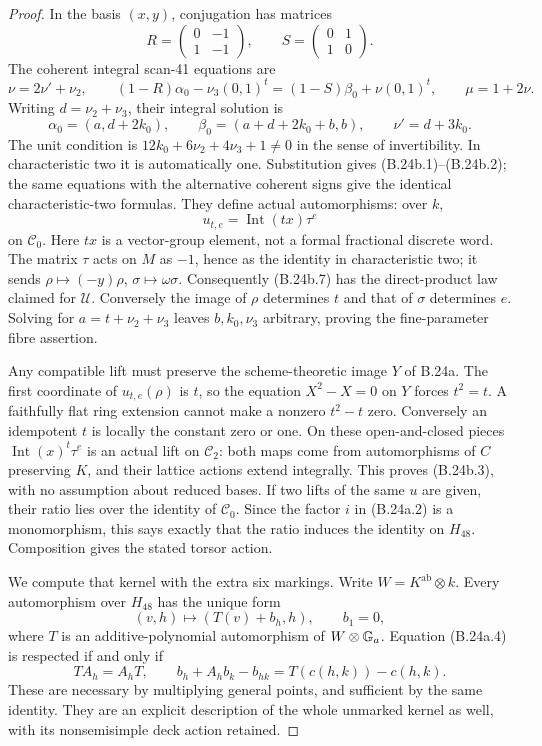 \begin{proof}
In the basis $(x,y)$, conjugation has matrices
\[
 R=\begin{pmatrix}0&-1\\1&-1\end{pmatrix},\qquad
 S=\begin{pmatrix}0&1\\1&0\end{pmatrix}.
\]
The coherent integral scan-41 equations are
\[
 \nu=2\nu'+\nu_2,\qquad
 (1-R)\alpha_0-\nu_3(0,1)^t
   =(1-S)\beta_0+\nu(0,1)^t,\qquad \mu=1+2\nu.
\]
Writing $d=\nu_2+\nu_3$, their integral solution is
\[
 \alpha_0=(a,d+2k_0),\qquad
 \beta_0=(a+d+2k_0+b,b),\qquad \nu'=d+3k_0.
\]
The unit condition is $12k_0+6\nu_2+4\nu_3+1\ne0$ in the
sense of invertibility.  In characteristic two it is automatically
one.  Substitution gives (B.24b.1)--(B.24b.2); the same equations with
the alternative coherent signs give the identical characteristic-two
formulas.  They define actual automorphisms: over $k$,
\[
                    u_{t,e}=\operatorname{Int}(t x)\tau^e
 \tag{B.24b.7}
\]
on $\mathscr C_0$.  Here $t x$ is a vector-group element, not a
formal fractional discrete word.  The matrix $\tau$ acts on $M$ as
$-1$, hence as the identity in characteristic two; it sends
$\rho\mapsto(-y)\rho$, $\sigma\mapsto\omega\sigma$.
Consequently (B.24b.7) has the direct-product law claimed for
$\mathscr U$.  Conversely the image of $\rho$ determines $t$
and that of $\sigma$ determines $e$.  Solving for
$a=t+\nu_2+\nu_3$ leaves $b,k_0,\nu_3$ arbitrary, proving the
fine-parameter fibre assertion.

Any compatible lift must preserve the scheme-theoretic image $Y$ of
B.24a.  The first coordinate of $u_{t,e}(\rho)$ is $t$, so the equation
$X^2-X=0$ on $Y$ forces $t^2=t$.  A faithfully flat ring extension
cannot make a nonzero $t^2-t$ zero.  Conversely an idempotent $t$
is locally the constant zero or one.  On these open-and-closed pieces
$\operatorname{Int}(x)^t\tau^e$ is an actual lift on $\mathscr C_2$:
both maps come from automorphisms of $C$ preserving $K$, and their
lattice actions extend integrally.  This proves (B.24b.3), with no
assumption about reduced bases.  If two lifts of the same $u$ are given,
their ratio lies over the identity of $\mathscr C_0$.  Since the
factor $i$ in (B.24a.2) is a monomorphism, this says exactly that the
ratio induces the identity on $H_{48}$.  Composition gives the stated
torsor action.

We compute that kernel with the extra six markings.  Write
$W=K^{\mathrm{ab}}\otimes k$.  Every automorphism over $H_{48}$
has the unique form
\[
             (v,h)\longmapsto(T(v)+b_h,h),\qquad b_1=0,
 \tag{B.24b.8}
\]
where $T$ is an additive-polynomial automorphism of $W\otimes\mathbb G_a$.
Equation (B.24a.4) is respected if and only if
\[
 T A_h=A_hT,\qquad
 b_h+A_hb_k-b_{hk}=T(c(h,k))-c(h,k).
 \tag{B.24b.9}
\]
These are necessary by multiplying general points, and sufficient by
the same identity.  They are an explicit description of the whole
unmarked kernel as well, with its nonsemisimple deck action retained.


\end{proof}
